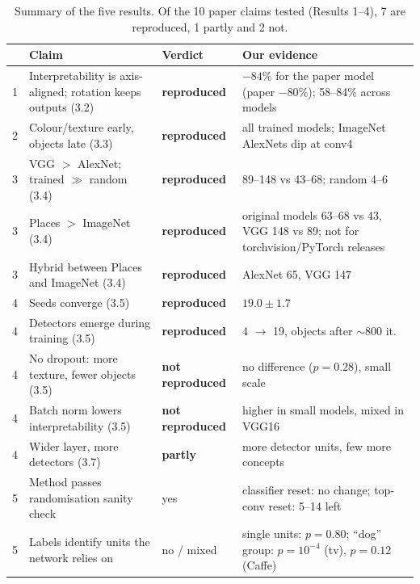 \documentclass[10pt,a4paper]{article}
\newcommand{\ok}{\textcolor{green!45!black}{\textbf{reproduced}}}
\newcommand{\partly}{\textcolor{orange!80!black}{\textbf{partly}}}
\newcommand{\no}{\textcolor{red!70!black}{\textbf{not reproduced}}}
\begin{document}
\begin{table}[t]\centering\small
\begin{tabularx}{\linewidth}{@{}lXlp{5.6cm}@{}}\toprule
& Claim & Verdict & Our evidence \\\midrule
1 & Interpretability is axis-aligned; rotation keeps outputs (3.2) & \ok & $-84\%$ for the paper model (paper $-80\%$); 58--84\% across models \\
2 & Colour/texture early, objects late (3.3) & \ok & all trained models; ImageNet AlexNets dip at conv4 \\
3 & VGG $>$ AlexNet; trained $\gg$ random (3.4) & \ok & 89--148 vs 43--68; random 4--6 \\
3 & Places $>$ ImageNet (3.4) & \ok & original models 63--68 vs 43, VGG 148 vs 89; not for torchvision/PyTorch releases \\
3 & Hybrid between Places and ImageNet (3.4) & \ok & AlexNet 65, VGG 147 \\
4 & Seeds converge (3.5) & \ok & $19.0\pm1.7$ \\
4 & Detectors emerge during training (3.5) & \ok & 4 $\to$ 19, objects after $\sim$800 it. \\
4 & No dropout: more texture, fewer objects (3.5) & \no & no difference ($p=0.28$), small scale \\
4 & Batch norm lowers interpretability (3.5) & \no & higher in small models, mixed in VGG16 \\
4 & Wider layer, more detectors (3.7) & \partly & more detector units, few more concepts \\\midrule
5 & Method passes randomisation sanity check & yes & classifier reset: no change; top-conv reset: 5--14 left \\
5 & Labels identify units the network relies on & no / mixed & single units: $p=0.80$; ``dog'' group: $p=10^{-4}$ (tv), $p=0.12$ (Caffe) \\\bottomrule
\end{tabularx}
\caption{Summary of the five results. Of the 10 paper claims tested (Results 1--4), 7 are reproduced, 1 partly and 2 not.}\label{tab:sum}
\end{table}
\end{document}
